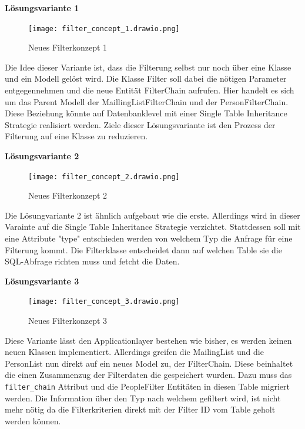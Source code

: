 \textbf{Lösungsvariante 1}

\begin{figure}[h]
   \centering
   \texttt{[image: filter\_concept\_1.drawio.png]}
   \caption{Neues Filterkonzept 1}
\end{figure}

Die Idee dieser Variante ist, dass die Filterung selbst nur noch über eine Klasse und ein Modell gelöst wird. Die Klasse Filter soll dabei
die nötigen Parameter entgegennehmen und die neue Entität Filter\:\:Chain aufrufen. Hier handelt es sich um das Parent Modell der MaillingList\:\:Filter\:\:Chain
und der Person\:\:Filter\:\:Chain. Diese Beziehung könnte auf Datenbanklevel mit einer Single Table Inheritance Strategie realisiert werden.
Ziele dieser Lösungsvariante ist den Prozess der Filterung auf eine Klasse zu reduzieren. 

\newpage

\textbf{Lösungsvariante 2}

\begin{figure}[h]
   \centering
   \texttt{[image: filter\_concept\_2.drawio.png]}
   \caption{Neues Filterkonzept 2}
\end{figure}

Die Lösungvariante 2 ist ähnlich aufgebaut wie die erste. Allerdings wird in dieser Varainte auf die Single Table Inheritance Strategie verzichtet.
Stattdessen soll mit eine Attribute "type" entschieden werden von welchem Typ die Anfrage für eine Filterung kommt. Die Filterklasse entscheidet dann
auf welchen Table sie die SQL-Abfrage richten muss und fetcht die Daten.  

\newpage

\textbf{Lösungsvariante 3}

\begin{figure}[h]
   \centering
   \texttt{[image: filter\_concept\_3.drawio.png]}
   \caption{Neues Filterkonzept 3}
\end{figure}

Diese Variante lässt den Applicationlayer bestehen wie bisher, es werden keinen neuen Klassen implementiert.
Allerdings greifen die MailingList und die PersonList nun direkt auf ein neues Model zu, der Filter\:\:Chain. Diese 
beinhaltet die einen Zusammenzug der Filterdaten die gespeichert wurden. Dazu muss das \texttt{filter\_chain} Attribut und die People\:\:Filter Entitäten 
in diesen Table migriert werden. Die Information über den Typ nach welchem gefiltert wird, ist nicht mehr nötig da die Filterkriterien direkt mit der Filter ID
vom Table geholt werden können.

